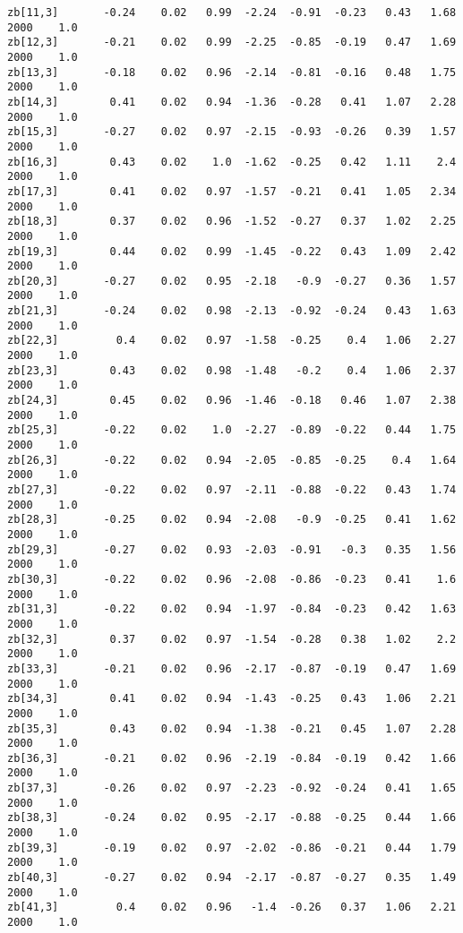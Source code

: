\documentclass[11pt]{article}
\begin{document}
\begin{Verbatim}[commandchars=\\\{\}]
zb[11,3]       -0.24    0.02   0.99  -2.24  -0.91  -0.23   0.43   1.68   2000    1.0
zb[12,3]       -0.21    0.02   0.99  -2.25  -0.85  -0.19   0.47   1.69   2000    1.0
zb[13,3]       -0.18    0.02   0.96  -2.14  -0.81  -0.16   0.48   1.75   2000    1.0
zb[14,3]        0.41    0.02   0.94  -1.36  -0.28   0.41   1.07   2.28   2000    1.0
zb[15,3]       -0.27    0.02   0.97  -2.15  -0.93  -0.26   0.39   1.57   2000    1.0
zb[16,3]        0.43    0.02    1.0  -1.62  -0.25   0.42   1.11    2.4   2000    1.0
zb[17,3]        0.41    0.02   0.97  -1.57  -0.21   0.41   1.05   2.34   2000    1.0
zb[18,3]        0.37    0.02   0.96  -1.52  -0.27   0.37   1.02   2.25   2000    1.0
zb[19,3]        0.44    0.02   0.99  -1.45  -0.22   0.43   1.09   2.42   2000    1.0
zb[20,3]       -0.27    0.02   0.95  -2.18   -0.9  -0.27   0.36   1.57   2000    1.0
zb[21,3]       -0.24    0.02   0.98  -2.13  -0.92  -0.24   0.43   1.63   2000    1.0
zb[22,3]         0.4    0.02   0.97  -1.58  -0.25    0.4   1.06   2.27   2000    1.0
zb[23,3]        0.43    0.02   0.98  -1.48   -0.2    0.4   1.06   2.37   2000    1.0
zb[24,3]        0.45    0.02   0.96  -1.46  -0.18   0.46   1.07   2.38   2000    1.0
zb[25,3]       -0.22    0.02    1.0  -2.27  -0.89  -0.22   0.44   1.75   2000    1.0
zb[26,3]       -0.22    0.02   0.94  -2.05  -0.85  -0.25    0.4   1.64   2000    1.0
zb[27,3]       -0.22    0.02   0.97  -2.11  -0.88  -0.22   0.43   1.74   2000    1.0
zb[28,3]       -0.25    0.02   0.94  -2.08   -0.9  -0.25   0.41   1.62   2000    1.0
zb[29,3]       -0.27    0.02   0.93  -2.03  -0.91   -0.3   0.35   1.56   2000    1.0
zb[30,3]       -0.22    0.02   0.96  -2.08  -0.86  -0.23   0.41    1.6   2000    1.0
zb[31,3]       -0.22    0.02   0.94  -1.97  -0.84  -0.23   0.42   1.63   2000    1.0
zb[32,3]        0.37    0.02   0.97  -1.54  -0.28   0.38   1.02    2.2   2000    1.0
zb[33,3]       -0.21    0.02   0.96  -2.17  -0.87  -0.19   0.47   1.69   2000    1.0
zb[34,3]        0.41    0.02   0.94  -1.43  -0.25   0.43   1.06   2.21   2000    1.0
zb[35,3]        0.43    0.02   0.94  -1.38  -0.21   0.45   1.07   2.28   2000    1.0
zb[36,3]       -0.21    0.02   0.96  -2.19  -0.84  -0.19   0.42   1.66   2000    1.0
zb[37,3]       -0.26    0.02   0.97  -2.23  -0.92  -0.24   0.41   1.65   2000    1.0
zb[38,3]       -0.24    0.02   0.95  -2.17  -0.88  -0.25   0.44   1.66   2000    1.0
zb[39,3]       -0.19    0.02   0.97  -2.02  -0.86  -0.21   0.44   1.79   2000    1.0
zb[40,3]       -0.27    0.02   0.94  -2.17  -0.87  -0.27   0.35   1.49   2000    1.0
zb[41,3]         0.4    0.02   0.96   -1.4  -0.26   0.37   1.06   2.21   2000    1.0

\end{Verbatim}
\end{document}
